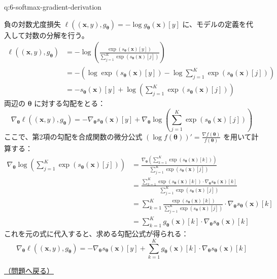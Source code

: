 \documentclass[
  pandoc]{bxjsarticle}
\begin{document}
\begin{answerbox}[phantomlabel=a:6-softmax-gradient-derivation]{q:6-softmax-gradient-derivation}

負の対数尤度損失
\(\ell((\mathbf{x}, y), g_{\boldsymbol{\theta}}) = -\log g_{\boldsymbol{\theta}}(\mathbf{x})[y]\)
に、モデルの定義を代入して対数の分解を行う。 \begin{align*}
\ell((\mathbf{x}, y), g_{\boldsymbol{\theta}}) &= -\log \left( \frac{\exp(s_{\boldsymbol{\theta}}(\mathbf{x})[y])}{\sum_{j=1}^K \exp(s_{\boldsymbol{\theta}}(\mathbf{x})[j])} \right) \\
&= -\left( \log \exp(s_{\boldsymbol{\theta}}(\mathbf{x})[y]) - \log \sum_{j=1}^K \exp(s_{\boldsymbol{\theta}}(\mathbf{x})[j]) \right) \\
&= -s_{\boldsymbol{\theta}}(\mathbf{x})[y] + \log \left( \sum_{j=1}^K \exp(s_{\boldsymbol{\theta}}(\mathbf{x})[j]) \right)
\end{align*} 両辺の \(\boldsymbol{\theta}\) に対する勾配をとる： \[
\nabla_{\boldsymbol{\theta}} \ell((\mathbf{x}, y), g_{\boldsymbol{\theta}}) = -\nabla_{\boldsymbol{\theta}} s_{\boldsymbol{\theta}}(\mathbf{x})[y] + \nabla_{\boldsymbol{\theta}} \log \left( \sum_{j=1}^K \exp(s_{\boldsymbol{\theta}}(\mathbf{x})[j]) \right)
\] ここで、第2項の勾配を合成関数の微分公式
\((\log f(\boldsymbol{\theta}))' = \frac{\nabla f(\boldsymbol{\theta})}{f(\boldsymbol{\theta})}\)
を用いて計算する： \begin{align*}
\nabla_{\boldsymbol{\theta}} \log \left( \sum_{j=1}^K \exp(s_{\boldsymbol{\theta}}(\mathbf{x})[j]) \right) &= \frac{\nabla_{\boldsymbol{\theta}} \left( \sum_{k=1}^K \exp(s_{\boldsymbol{\theta}}(\mathbf{x})[k]) \right)}{\sum_{j=1}^K \exp(s_{\boldsymbol{\theta}}(\mathbf{x})[j])} \\
&= \frac{\sum_{k=1}^K \exp(s_{\boldsymbol{\theta}}(\mathbf{x})[k]) \cdot \nabla_{\boldsymbol{\theta}} s_{\boldsymbol{\theta}}(\mathbf{x})[k]}{\sum_{j=1}^K \exp(s_{\boldsymbol{\theta}}(\mathbf{x})[j])} \\
&= \sum_{k=1}^K \frac{\exp(s_{\boldsymbol{\theta}}(\mathbf{x})[k])}{\sum_{j=1}^K \exp(s_{\boldsymbol{\theta}}(\mathbf{x})[j])} \cdot \nabla_{\boldsymbol{\theta}} s_{\boldsymbol{\theta}}(\mathbf{x})[k] \\
&= \sum_{k=1}^K g_{\boldsymbol{\theta}}(\mathbf{x})[k] \cdot \nabla_{\boldsymbol{\theta}} s_{\boldsymbol{\theta}}(\mathbf{x})[k]
\end{align*} これを元の式に代入すると、求める勾配公式が得られる： \[
\nabla_{\boldsymbol{\theta}} \ell((\mathbf{x}, y), g_{\boldsymbol{\theta}}) = -\nabla_{\boldsymbol{\theta}} s_{\boldsymbol{\theta}}(\mathbf{x})[y] + \sum_{k=1}^K g_{\boldsymbol{\theta}}(\mathbf{x})[k] \cdot \nabla_{\boldsymbol{\theta}} s_{\boldsymbol{\theta}}(\mathbf{x})[k]
\]

\hfill 

\hyperref[q:6-softmax-gradient-derivation]{（問題へ戻る）}

\end{answerbox}
\end{document}
